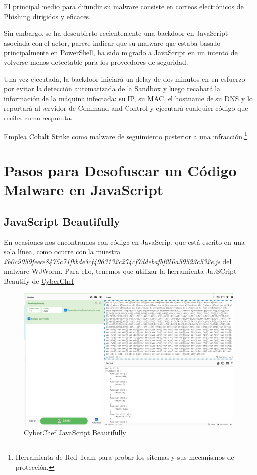 \documentclass[15pt]{article}
\begin{document}
	El principal medio para difundir su malware consiste en correos electrónicos de Phishing dirigidos y eficaces.
	
	Sin embargo, se ha descubierto recientemente una backdoor en JavaScript asociada con el actor, parece indicar que su malware que estaba basado principalmente en PowerShell, ha sido migrado a JavaScript en un intento de volverse menos detectable para los proveedores de seguridad.
	
	Una vez ejecutada, la backdoor iniciará un delay de dos minutos en un esfuerzo por evitar la detección automatizada de la Sandbox y luego recabará la información de la máquina infectada: su IP, su MAC, el hostname de su DNS y lo reportará al servidor de Command-and-Control y ejecutará cualquier código que reciba como respuesta.
	
	Emplea Cobalt Strike\cite{cobaltstrike} como malware de seguimiento posterior a una infracción.\footnote{Herramienta de Red Team para probar los sitemas y sus mecanismos de protección. }
	
	\newpage
	\section{Pasos para Desofuscar un Código Malware en JavaScript\label{desobfuscation}}
		
	\subsection{JavaScript Beautifully}
	En ocasiones nos encontramos con código en JavaScript que está escrito en una sola línea, como ocurre con la muestra \textit{2b0c9059feece8475c71fbbde6cf4963132c274cf7ddebafbf2b0a59523c532e.js} del malware WJWorm. Para ello, tenemos que utilizar la herramienta JavSCript Beautify de \href{https://gchq.github.io/CyberChef}{CyberChef}
	
	\begin{figure}[H]
		\centering
		\includegraphics[width=18cm]{images/beautifully.png}
		\caption{CyberChef JavaScript Beautifully}
	\end{figure}
	
\end{document}
